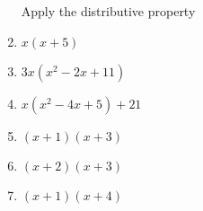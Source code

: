 \documentclass[12pt, oneside]{article}
\begin{document}
\begin{enumerate}
\newpage
Apply the distributive property
  \item $x(x+5)$ \vspace{2cm}
  \item $3x(x^2-2x+11)$ \vspace{2.5cm}
  \item $x(x^2-4x+5)+21$  \vspace{2.5cm}
  \item $(x+1)(x+3)$ \vspace{3cm}
  \item $(x+2)(x+3)$ \vspace{3cm}
  \item $(x+1)(x+4)$ \vspace{3cm}


\end{enumerate}
\end{document}
